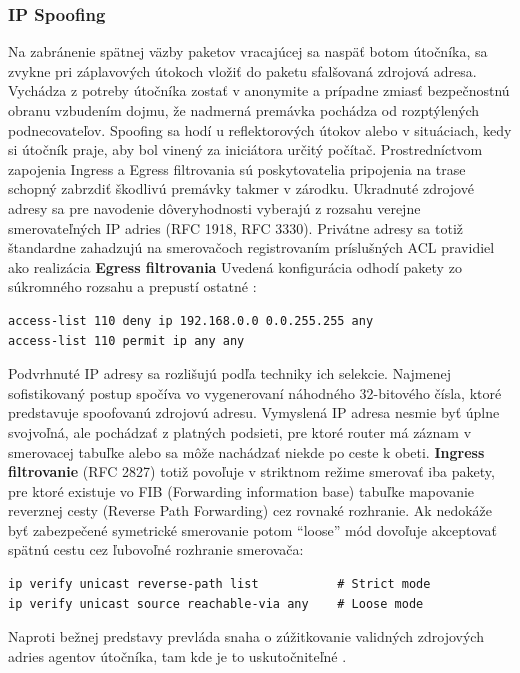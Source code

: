 \documentclass[12pt, a4paper]{article}
\begin{document}
\subsubsection{IP Spoofing}
Na zabránenie spätnej väzby paketov vracajúcej sa naspäť botom útočníka, sa zvykne pri záplavových útokoch 
vložiť do paketu sfalšovaná zdrojová adresa. Vychádza z potreby útočníka zostať v anonymite a prípadne 
zmiasť bezpečnostnú obranu vzbudením dojmu, že nadmerná premávka pochádza od rozptýlených podnecovateľov. 
Spoofing sa hodí u reflektorových útokov alebo v situáciach, kedy si útočník praje, aby bol vinený za 
iniciátora určitý počítač. Prostredníctvom zapojenia Ingress a Egress filtrovania sú poskytovatelia 
pripojenia na trase schopný zabrzdiť škodlivú premávky takmer v zárodku. Ukradnuté zdrojové adresy sa 
pre navodenie dôveryhodnosti vyberajú z rozsahu verejne smerovateľných IP adries (RFC 1918, RFC 3330). 
Privátne adresy sa totiž  štandardne zahadzujú na smerovačoch registrovaním príslušných ACL pravidiel ako 
realizácia \textbf{Egress filtrovania} Uvedená konfigurácia odhodí pakety zo súkromného rozsahu a 
prepustí ostatné \cite{cisco-spoofing-rules}: 
\begin{lstlisting}
access-list 110 deny ip 192.168.0.0 0.0.255.255 any
access-list 110 permit ip any any
\end{lstlisting}

Podvrhnuté IP adresy sa rozlišujú podľa techniky ich selekcie. Najmenej sofistikovaný postup spočíva vo 
vygenerovaní náhodného 32-bitového čísla, ktoré predstavuje spoofovanú zdrojovú adresu. 
Vymyslená IP adresa nesmie byť úplne svojvoľná, ale pochádzať z platných podsieti, pre ktoré router má 
záznam v smerovacej tabuľke alebo sa môže nachádzať niekde po ceste k obeti. \textbf{Ingress filtrovanie}
(RFC 2827) totiž povoľuje v striktnom režime smerovať iba pakety, pre ktoré existuje vo FIB (Forwarding 
information base) tabuľke mapovanie reverznej cesty (Reverse Path Forwarding) cez rovnaké rozhranie. Ak 
nedokáže byť zabezpečené symetrické  smerovanie potom \enquote{loose} mód dovoľuje akceptovať spätnú cestu 
cez ľubovoľné rozhranie smerovača:
\begin{lstlisting}
ip verify unicast reverse-path list           # Strict mode
ip verify unicast source reachable-via any    # Loose mode
\end{lstlisting}
Naproti bežnej predstavy prevláda snaha o zúžitkovanie validných zdrojových adries agentov útočníka,
tam kde je to uskutočniteľné \cite{ddos-anatomy-2004}.
\end{document}
